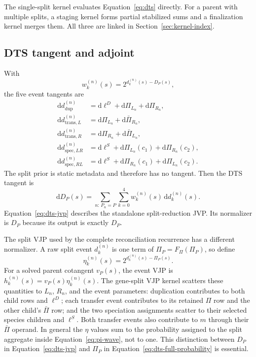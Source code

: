 \documentclass[11pt]{article}
\newcommand{\dd}{\mathrm{d}}
\begin{document}
The single-split kernel evaluates Equation~\eqref{eq:dts} directly.  For a
parent with multiple splits, a staging kernel forms partial stabilized sums
and a finalization kernel merges them.  All three are linked in
Section~\ref{sec:kernel-index}.

\subsection{DTS tangent and adjoint}

With
\begin{equation}
  w_k^{(n)}(s)=2^{d_k^{(n)}(s)-D_P(s)},
\end{equation}
the five event tangents are
\begin{align}
  \dd d_{\mathrm{dup}}^{(n)}
    &=\dd\ell^D+\dd\Pi_{L_n}+\dd\Pi_{R_n},\\
  \dd d_{\mathrm{trans},L}^{(n)}
    &=\dd\Pi_{L_n}+\dd\bar\Pi_{R_n},\\
  \dd d_{\mathrm{trans},R}^{(n)}
    &=\dd\Pi_{R_n}+\dd\bar\Pi_{L_n},\\
  \dd d_{\mathrm{spec},LR}^{(n)}
    &=\dd\ell^S+\dd\Pi_{L_n}(c_1)+\dd\Pi_{R_n}(c_2),\\
  \dd d_{\mathrm{spec},RL}^{(n)}
    &=\dd\ell^S+\dd\Pi_{R_n}(c_1)+\dd\Pi_{L_n}(c_2).
  \label{eq:dts-event-jvps}
\end{align}
The split prior is static metadata and therefore has no tangent.  Then
the DTS tangent is
\begin{equation}
  \dd D_P(s)=
  \sum_{n:\,P_n=P}\sum_{k=0}^4w_k^{(n)}(s)\,\dd d_k^{(n)}(s).
  \label{eq:dts-jvp}
\end{equation}
Equation~\eqref{eq:dts-jvp} describes the standalone split-reduction JVP.  Its
normalizer is $D_P$ because its output is exactly $D_P$.

The split VJP used by the complete reconciliation recurrence has a different
normalizer.  A raw split event $d_k^{(n)}$ is one term of
$\Pi_P=F_\Pi(\Pi_P)$, so define
\begin{equation}
  \eta_k^{(n)}(s)=2^{d_k^{(n)}(s)-\Pi_P(s)}.
  \label{eq:dts-full-probability}
\end{equation}
For a solved parent cotangent $v_P(s)$, the event VJP is
$h_k^{(n)}(s)=v_P(s)\eta_k^{(n)}(s)$.  The gene-split VJP kernel scatters
these quantities to $L_n$, $R_n$, and the event parameters: duplication
contributes to both child rows and $\ell^D$; each transfer event contributes
to its retained $\Pi$ row and the other child's $\bar\Pi$ row; and the two
speciation assignments scatter to their selected species children and
$\ell^S$.  Both transfer events also contribute to $m$ through their
$\bar\Pi$ operand.  In general the $\eta$ values sum to the probability
assigned to the split aggregate inside
Equation~\eqref{eq:pi-wave}, not to one.  This distinction between $D_P$ in
Equation~\eqref{eq:dts-jvp} and $\Pi_P$ in
Equation~\eqref{eq:dts-full-probability} is essential.
\end{document}
